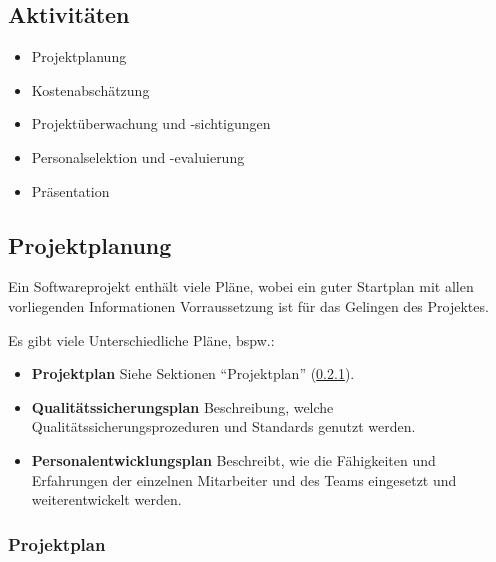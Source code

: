 \documentclass[a4paper, 11pt, accentcolor = tud3b]{tudreport}
\begin{document}
			\subsection{Aktivitäten}
				\begin{itemize}
					\item Projektplanung
					\item Kostenabschätzung
					\item Projektüberwachung und -sichtigungen
					\item Personalselektion und -evaluierung
					\item Präsentation
				\end{itemize}
			
			\subsection{Projektplanung}
				Ein Softwareprojekt enthält viele Pläne, wobei ein guter Startplan mit allen vorliegenden Informationen Vorraussetzung ist für das Gelingen des Projektes.
				
				Es gibt viele Unterschiedliche Pläne, bspw.:
				\begin{itemize}
					\item \textbf{Projektplan} Siehe Sektionen \enquote{Projektplan} (\ref{ssec:projektplan}).
					\item \textbf{Qualitätssicherungsplan} Beschreibung, welche Qualitätssicherungsprozeduren und Standards genutzt werden.
					\item \textbf{Personalentwicklungsplan} Beschreibt, wie die Fähigkeiten und Erfahrungen der einzelnen Mitarbeiter und des Teams eingesetzt und weiterentwickelt werden.
				\end{itemize}
				
				\subsubsection{Projektplan}
					\label{ssec:projektplan}
					
\end{document}

